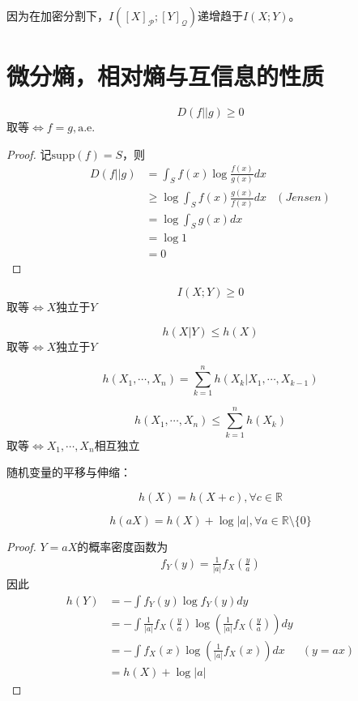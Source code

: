 \documentclass{ctexbook}
\newcommand{\aee}{\text{a.e.}}             %
\begin{document}
因为在加密分割下，$I([X]_\mathcal{P};[Y]_\mathcal{Q})$递增趋于$I(X;Y)$。

\section{微分熵，相对熵与互信息的性质}

\begin{theorem}
    $$D(f||g)\geq 0$$
    取等$\iff f=g,\aee$
\end{theorem}
\begin{proof}
    记$\text{supp}(f)=S$，则\begin{align*}
        D(f||g)&=\int_S f(x)\log \frac{f(x)}{g(x)}dx\\
        &\geq \log\int_S f(x)\frac{g(x)}{f(x)}dx&(Jensen)\\
        &=\log\int_S g(x)dx\\
        &=\log 1\\
        &=0
    \end{align*}
\end{proof}
\begin{corollary}
    $$I(X;Y)\geq 0$$
    取等$\iff X$独立于$Y$
\end{corollary}

\begin{corollary}
    $$h(X|Y)\leq h(X)$$
    取等$\iff X$独立于$Y$
\end{corollary}

\begin{theorem}[微分熵的链式法则]
    $$h(X_1,\cdots,X_n)=\sum_{k=1}^{n}h(X_k|X_1,\cdots,X_{k-1})$$
\end{theorem}
\begin{corollary}
    $$h(X_1,\cdots,X_n)\leq \sum_{k=1}^{n}h(X_k)$$
    取等$\iff X_1,\cdots,X_n$相互独立
\end{corollary}

随机变量的平移与伸缩：

\begin{theorem}
    $$h(X)=h(X+c),\forall c\in \mathbb{R}$$
\end{theorem}

\begin{theorem}
    $$h(aX)=h(X)+\log |a|,\forall a\in \mathbb{R}\setminus\{0\}$$
\end{theorem}
\begin{proof}
    $Y=aX$的概率密度函数为\begin{align*}
        f_Y(y)=\frac{1}{|a|}f_X\left(\frac{y}{a}\right)
    \end{align*}
    因此\begin{align*}
        h(Y)&=-\int f_Y(y)\log f_Y(y)dy\\
        &=-\int \frac{1}{|a|}f_X\left(\frac{y}{a}\right)\log \left(\frac{1}{|a|}f_X\left(\frac{y}{a}\right)\right)dy\\
        &=-\int f_X(x)\log \left(\frac{1}{|a|}f_X(x)\right)dx&(y=ax)\\
        &=h(X)+\log |a|
    \end{align*}
\end{proof}
\end{document}
